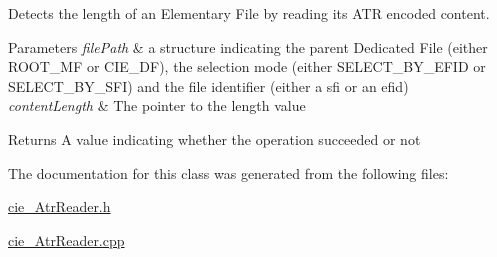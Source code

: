 Detects the length of an Elementary File by reading its A\+TR encoded content. 


\begin{DoxyParams}{Parameters}
{\em file\+Path} & a structure indicating the parent Dedicated File (either R\+O\+O\+T\+\_\+\+MF or C\+I\+E\+\_\+\+DF), the selection mode (either S\+E\+L\+E\+C\+T\+\_\+\+B\+Y\+\_\+\+E\+F\+ID or S\+E\+L\+E\+C\+T\+\_\+\+B\+Y\+\_\+\+S\+FI) and the file identifier (either a sfi or an efid) \\
\hline
{\em content\+Length} & The pointer to the length value\\
\hline
\end{DoxyParams}
\begin{DoxyReturn}{Returns}
A value indicating whether the operation succeeded or not 
\end{DoxyReturn}


The documentation for this class was generated from the following files\+:\begin{DoxyCompactItemize}
\item 
\hyperlink{cie__AtrReader_8h}{cie\+\_\+\+Atr\+Reader.\+h}\item 
\hyperlink{cie__AtrReader_8cpp}{cie\+\_\+\+Atr\+Reader.\+cpp}\end{DoxyCompactItemize}
